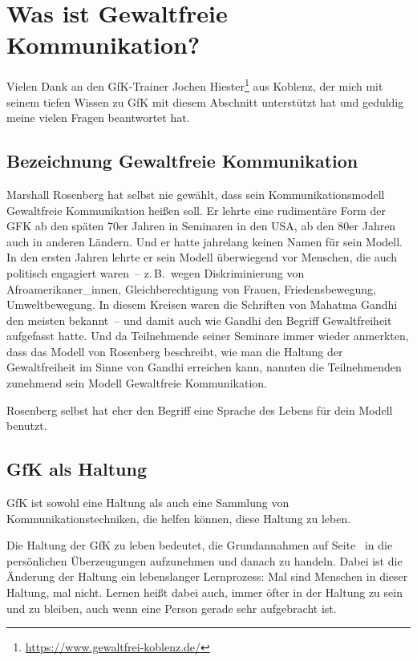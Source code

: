 \section{Was ist Gewaltfreie Kommunikation?}

Vielen Dank an den GfK-Trainer Jochen Hiester\footnote{\url{https://www.gewaltfrei-koblenz.de/}} aus Koblenz, der mich mit seinem tiefen Wissen zu GfK mit diesem Abschnitt unterstützt hat und geduldig meine vielen Fragen beantwortet hat.


\subsection{Bezeichnung \glqq Gewaltfreie Kommunikation\grqq}

Marshall Rosenberg hat selbst nie gewählt, dass sein Kommunikationsmodell Gewaltfreie Kommunikation heißen soll. Er lehrte eine rudimentäre Form der GFK ab den späten 70er Jahren in Seminaren in den USA, ab den 80er Jahren auch in anderen Ländern. Und er hatte jahrelang keinen Namen für sein Modell. In den ersten Jahren lehrte er sein Modell überwiegend vor Menschen, die auch politisch engagiert waren~-- z.\,B.~wegen Diskriminierung von Afroamerikaner\_innen, Gleichberechtigung von Frauen, Friedensbewegung, Umweltbewegung. In diesem Kreisen waren die Schriften von Mahatma Gandhi den meisten bekannt~-- und damit auch wie Gandhi den Begriff \glqq Gewaltfreiheit\grqq{} aufgefasst hatte. Und da Teilnehmende seiner Seminare immer wieder anmerkten, dass das Modell von Rosenberg beschreibt, wie man die Haltung der Gewaltfreiheit im Sinne von Gandhi erreichen kann, nannten die Teilnehmenden zunehmend sein Modell Gewaltfreie Kommunikation.

Rosenberg selbst hat eher den Begriff \glqq eine Sprache des Lebens\grqq{} für dein Modell benutzt.


\subsection{GfK als Haltung}
\label{gfk-haltung}

GfK ist sowohl eine Haltung als auch eine Sammlung von Kommunikationstechniken, die helfen können, diese Haltung zu leben.

Die Haltung der GfK zu leben bedeutet, die Grundannahmen auf Seite~\pageref{gfk-annahmen} in die persönlichen Überzeugungen aufzunehmen und danach zu handeln. Dabei ist die Änderung der Haltung ein lebenslanger Lernprozess: Mal sind Menschen in dieser Haltung, mal nicht. Lernen heißt dabei auch, immer öfter in der Haltung zu sein und zu bleiben, auch wenn eine Person gerade sehr aufgebracht ist.



